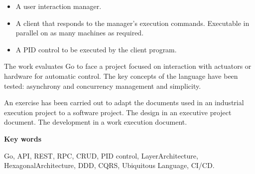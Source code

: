\begin{itemize}
    \item A user interaction manager.
    \item A client that responds to the manager's execution commands.
    Executable in parallel on as many machines as required.
    \item A PID control to be executed by the client program.
\end{itemize}

The work evaluates Go to face a project focused on interaction with actuators or hardware for automatic control.
The key concepts of the language have been tested: asynchrony and concurrency management and simplicity.

An exercise has been carried out to adapt the documents used in an industrial execution project to a software project.
The design in an executive project document.
The development in a work execution document.

\textbf{Key words}

Go,
API,
REST,
RPC,
CRUD,
PID control,
LayerArchitecture,
HexagonalArchitecture,
DDD,
CQRS,
Ubiquitous Language,
CI/CD.